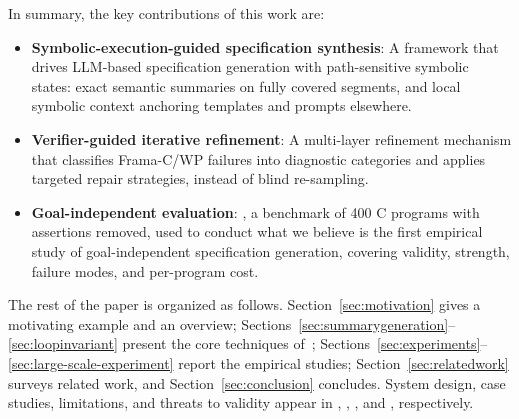 In summary, the key contributions of this work are:
\begin{itemize}
\item \textbf{Symbolic-execution-guided specification synthesis}: 
A framework that drives LLM-based specification generation with path-sensitive symbolic states: exact semantic summaries on fully covered segments, and local symbolic context anchoring templates and prompts elsewhere.
\item \textbf{Verifier-guided iterative refinement}: A multi-layer refinement mechanism that classifies Frama-C/WP failures into diagnostic categories and applies targeted repair strategies, instead of blind re-sampling.
\item \textbf{Goal-independent evaluation}: \textbf{}, a benchmark of 400 C programs with assertions removed, used to conduct what we believe is the first empirical study of goal-independent specification generation, covering validity, strength, failure modes, and per-program cost.
\end{itemize}

The rest of the paper is organized as follows. Section~\ref{sec:motivation} gives a motivating example and an overview; Sections~\ref{sec:summarygeneration}--\ref{sec:loopinvariant} present the core techniques of\ \toolname; Sections~\ref{sec:experiments}--\ref{sec:large-scale-experiment} report the empirical studies; Section~\ref{sec:relatedwork} surveys related work, and Section~\ref{sec:conclusion} concludes. System design, case studies, limitations, and threats to validity appear in , , , and , respectively.
